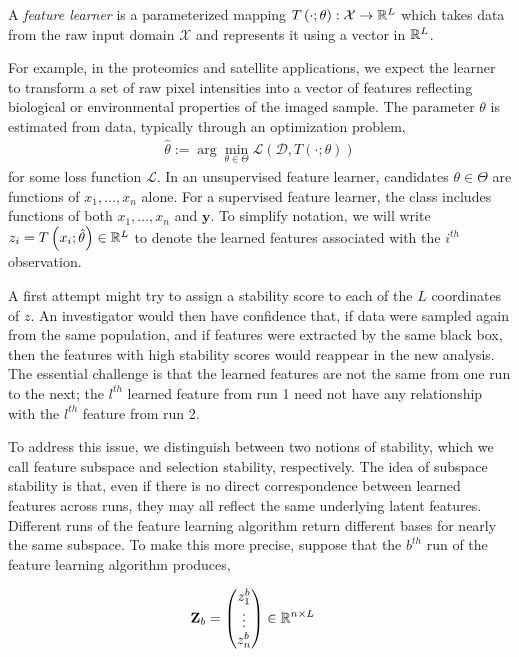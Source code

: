 \begin{definition}
A \textit{feature learner} is a parameterized mapping $T\left(\cdot;
\theta\right): \mathcal{X} \to \mathbb{R}^{L}$ which takes data from the raw input
domain $\mathcal{X}$ and represents it using a vector in $\mathbb{R}^{L}$.
\end{definition}

For example, in the proteomics and satellite applications, we expect the learner
to transform a set of raw pixel intensities into a vector of features reflecting
biological or environmental properties of the imaged sample. The parameter
$\theta$ is estimated from data, typically through an optimization problem,
\begin{align*}
  \hat{\theta} := \arg\min_{\theta \in \Theta} \mathcal{L}\left(\mathcal{D}, T\left(\cdot; \theta\right)\right)
\end{align*}
for some loss function $\mathcal{L}$. In an unsupervised feature learner,
candidates $\theta \in \Theta$ are functions of $x_{1}, \dots, x_{n}$ alone. For
a supervised feature learner, the class includes functions of both
$x_{1}, \dots, x_{n}$ and $\mathbf{y}$. To simplify notation, we will write
$z_{i} = T\left(x_{i}; \hat{\theta}\right) \in
\mathbb{R}^{L}$ to denote the learned features associated with the $i^{th}$
observation.

A first attempt might try to assign a stability score to each of the $L$
coordinates of $z$. An investigator would then have confidence that, if data
were sampled again from the same population, and if features were extracted by
the same black box, then the features with high stability scores would reappear
in the new analysis. The essential challenge is that the learned features are
not the same from one run to the next; the $l^{th}$ learned feature from run 1
need not have any relationship with the $l^{th}$ feature from run 2.

To address this issue, we distinguish between two notions of stability, which we
call feature subspace and selection stability, respectively. The idea of
subspace stability is that, even if there is no direct correspondence between
learned features across runs, they may all reflect the same underlying latent
features. Different runs of the feature learning algorithm return different
bases for nearly the same subspace. To make this more precise, suppose that the
$b^{th}$ run of the feature learning algorithm produces,

\begin{align*}
\mathbf{Z}_{b} &= \begin{pmatrix}
z^{b}_{1} \\
\vdots \\
z^{b}_{n}
\end{pmatrix} \in \mathbb{R}^{n \times L}
\end{align*}

